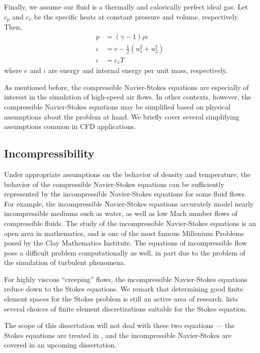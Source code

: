 Finally, we assume our fluid is a thermally and calorically perfect ideal gas. Let $c_p$ and $c_v$ be the specific heats at constant pressure and volume, respectively. Then,
\begin{align*}
p &= (\gamma-1)\rho\iota\\
\iota &= e-\frac{1}{2}(u_1^2+u_2^2)\\
\iota &= c_vT
\end{align*}
where $e$ and $\iota$ are energy and internal energy per unit mass, respectively. 

As mentioned before, the compressible Navier-Stokes equations are especially of interest in the simulation of high-speed air flows. In other contexts, however, the compressible Navier-Stokes equations may be simplified based on physical assumptions about the problem at hand. We briefly cover several simplifying assumptions common in CFD applications. 

\subsection{Incompressibility}

Under appropriate assumptions on the behavior of density and temperature, the behavior of the compressible Navier-Stokes equations can be sufficiently represented by the incompressible Navier-Stokes equations for some fluid flows.  For example, the incompressible Navier-Stokes equations accurately model nearly incompressible mediums such as water, as well as low Mach number flows of compressible fluids. The study of the incompressible Navier-Stokes equations is an open area in mathematics, and is one of the most famous Millenium Problems posed by the Clay Mathematics Institute. The equations of incompressible flow pose a difficult problem computationally as well, in part due to the problem of the simulation of turbulent phenomena. 

For highly viscous ``creeping'' flows, the incompressible Navier-Stokes equations reduce down to the Stokes equations. We remark that determining good finite element spaces for the Stokes problem is still an active area of research. \cite{stokesFEM} lists several choices of finite element discretizations suitable for the Stokes equation. 

The scope of this dissertation will not deal with these two equations --- the Stokes equations are treated in \cite{stokesDPG}, and the incompressible Navier-Stokes are covered in an upcoming dissertation. 

